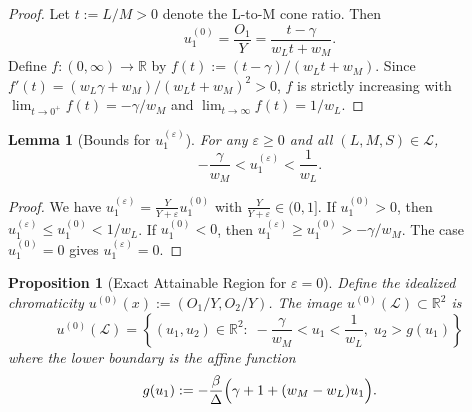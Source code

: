 \documentclass[11pt]{article}
\theoremstyle{plain}
\newtheorem{proposition}[theorem]{Proposition}
\newtheorem{lemma}[theorem]{Lemma}
\theoremstyle{definition}
\theoremstyle{remark}
\newcommand{\R}{\mathbb{R}}
\begin{document}
\begin{proof}
Let $t := L/M > 0$ denote the L-to-M cone ratio. Then 
\begin{equation}
u_1^{(0)} = \frac{O_1}{Y} = \frac{t - \gamma}{w_L t + w_M}.
\end{equation}
Define $f: (0, \infty) \to \R$ by $f(t) := (t - \gamma)/(w_L t + w_M)$.
Since $f'(t) = (w_L \gamma + w_M)/(w_L t + w_M)^2 > 0$, $f$ is strictly increasing with $\lim_{t \to 0^+} f(t) = -\gamma/w_M$ and $\lim_{t \to \infty} f(t) = 1/w_L$.
\end{proof}

\begin{lemma}[Bounds for $u_1^{(\varepsilon)}$]
\label{lem:u1-eps-bounds}
For any $\varepsilon \geq 0$ and all $(L, M, S) \in \mathcal{L}$,
\begin{equation}
-\frac{\gamma}{w_M} < u_1^{(\varepsilon)} < \frac{1}{w_L}.
\end{equation}
\end{lemma}

\begin{proof}
We have $u_1^{(\varepsilon)} = \frac{Y}{Y+\varepsilon} u_1^{(0)}$ with $\frac{Y}{Y+\varepsilon} \in (0, 1]$. If $u_1^{(0)} > 0$, then $u_1^{(\varepsilon)} \leq u_1^{(0)} < 1/w_L$. If $u_1^{(0)} < 0$, then $u_1^{(\varepsilon)} \geq u_1^{(0)} > -\gamma/w_M$. The case $u_1^{(0)} = 0$ gives $u_1^{(\varepsilon)} = 0$.
\end{proof}

\begin{proposition}[Exact Attainable Region for $\varepsilon = 0$]
\label{prop:attainable-eps0}
Define the idealized chromaticity $u^{(0)}(x) := (O_1/Y, O_2/Y)$. The image $u^{(0)}(\mathcal{L}) \subset \R^2$ is
\begin{equation}
\boxed{
u^{(0)}(\mathcal{L}) = \left\{(u_1,u_2) \in \R^2 :\; -\frac{\gamma}{w_M} < u_1 < \frac{1}{w_L},\; u_2 > g(u_1) \right\}
}
\end{equation}
where the lower boundary is the affine function
\begin{equation}
g(u_1) := -\frac{\beta}{\Delta}\Bigl(\gamma+1+(w_M-w_L)u_1\Bigr).
\end{equation}
\end{proposition}
\end{document}
